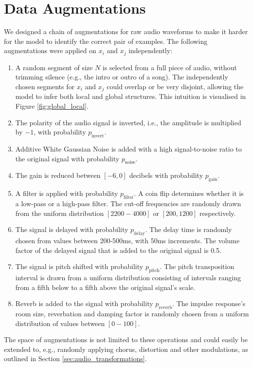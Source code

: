 \section{Data Augmentations}
We designed a chain of augmentations for raw audio waveforms to make it harder for the model to identify the correct pair of examples.
The following augmentations were applied on ${x_i}$ and ${x_j}$ independently:
\begin{enumerate}
    \item A random segment of size $N$ is selected from a full piece of audio, without trimming silence (e.g., the intro or outro of a song).
    The independently chosen segments for $x_i$ and $x_j$ could overlap or be very disjoint, allowing the model to infer both local and global structures. This intuition is visualised in Figure \ref{fig:global_local}.
    \item The polarity of the audio signal is inverted, i.e., the amplitude is multiplied by $-1$, with probability $p_{\mathrm{invert}}$.
    \item Additive White Gaussian Noise is added with a high signal-to-noise ratio to the original signal with probability $p_{\mathrm{noise}}$.
    \item The gain is reduced between $[-6, 0]$ decibels with probability $p_{\mathrm{gain}}$.
    \item A filter is applied with probability $p_{\mathrm{filter}}$.
    A coin flip determines whether it is a low-pass or a high-pass filter. The cut-off frequencies are randomly drawn from the uniform distribution $[2200-4000]$ or $[200,1200]$ respectively.
    \item The signal is delayed with probability $p_{\mathrm{delay}}$.
The delay time is randomly chosen from values between 200-500ms, with 50ms increments.
The volume factor of the delayed signal that is added to the original signal is 0.5.
    \item The signal is pitch shifted with probability $p_{\mathrm{pitch}}$.
The pitch transposition interval is drawn from a uniform distribution consisting of intervals ranging from a fifth below to a fifth above the original signal's scale.
    \item Reverb is added to the signal with probability $p_{\mathrm{reverb}}$.
The impulse response's room size, reverbation and damping factor is randomly chosen from a uniform distribution of values between $[0-100]$.
\end{enumerate}
The space of augmentations is not limited to these operations and could easily be extended to, e.g., randomly applying chorus, distortion and other modulations, as outlined in Section \ref{sec:audio_transformations}.



